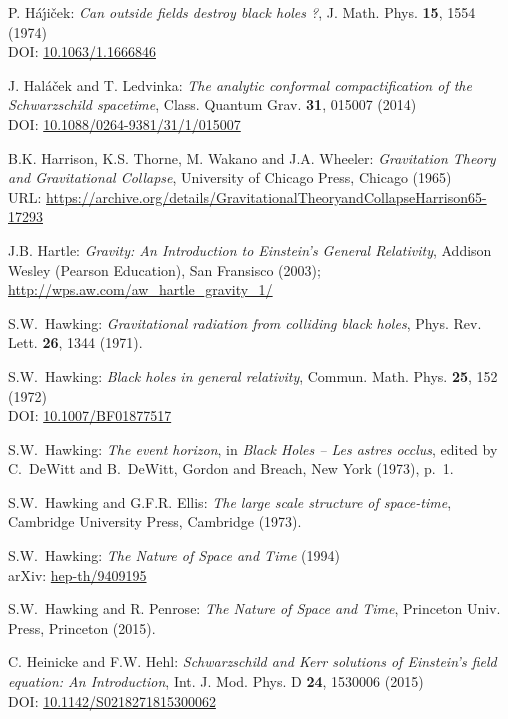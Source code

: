 \begin{thebibliography}{123}
P. H\'a\'\j i\v{c}ek: {\em Can outside fields destroy black holes ?},
J. Math. Phys. {\bf 15}, 1554 (1974)\\
DOI: \href{https://doi.org/10.1063/1.1666846}{10.1063/1.1666846}

J. Hal\'a\v{c}ek and T. Ledvinka:
{\em The analytic conformal compactification of the Schwarzschild spacetime},
Class. Quantum Grav. {\bf 31}, 015007 (2014)\\
DOI: \href{https://doi.org/10.1088/0264-9381/31/1/015007}{10.1088/0264-9381/31/1/015007}

B.K. Harrison, K.S. Thorne, M. Wakano and J.A. Wheeler:
{\em Gravitation Theory and Gravitational Collapse},
University of Chicago Press, Chicago (1965)\\
URL: {\footnotesize\url{https://archive.org/details/GravitationalTheoryandCollapseHarrison65-17293}}

J.B. Hartle: \emph{Gravity: An Introduction to Einstein's General Relativity},
Addison Wesley (Pearson Education), San Fransisco (2003); \\
\url{http://wps.aw.com/aw_hartle_gravity_1/}

S.W.~Hawking: {\em Gravitational radiation from colliding black holes},
Phys. Rev. Lett. {\bf 26}, 1344 (1971).

S.W.~Hawking: {\em Black holes in general relativity},
Commun. Math. Phys. {\bf 25}, 152 (1972)\\
DOI: \href{https://doi.org/10.1007/BF01877517}{10.1007/BF01877517}

S.W.~Hawking: {\em The event horizon},
in {\em Black Holes -- Les astres occlus}, edited by C.~DeWitt and B.~DeWitt,
Gordon and Breach, New York (1973), p.~1.

S.W.~Hawking and G.F.R. Ellis: {\em The large scale structure of
space-time},
Cambridge University Press, Cambridge (1973).

S.W.~Hawking: {\em The Nature of Space and Time} (1994)\\
arXiv: \href{https://arxiv.org/abs/hep-th/9409195}{hep-th/9409195}

S.W.~Hawking and R. Penrose: {\em The Nature of Space and Time},
Princeton Univ. Press, Princeton (2015).

C. Heinicke and F.W. Hehl:
{\em Schwarzschild and Kerr solutions of Einstein's field equation: An Introduction},
Int. J. Mod. Phys. D {\bf 24}, 1530006 (2015)\\
DOI: \href{https://doi.org/10.1142/S0218271815300062}{10.1142/S0218271815300062}


\end{thebibliography}

